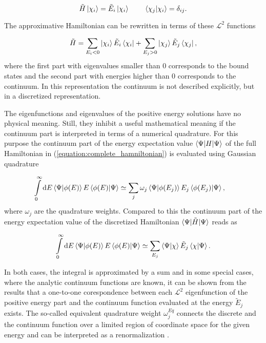 \begin{equation}
  \tilde{H} \ket{\chi_i} = \tilde{E}_i \ket{\chi_i} \quad\quad  \,
  \braket{\chi_j|\chi_i} = \delta_{ij} .
\end{equation}

The approximative Hamiltonian can be rewritten in terms of these $\mathcal{L}^2$
functions

\begin{equation} \label{equation:discrete_hamiltonian}
  \tilde{H} = \sum\limits_{E_i<0} \ket{\chi_i} \tilde{E}_i \bra{\chi_i}
            + \sum\limits_{E_j>0} \ket{\chi_j} \tilde{E}_j \bra{\chi_j}   ,
\end{equation}
where the first part with eigenvalues smaller than 0 corresponds to the
bound states and the second part with energies higher than 0 corresponds to
the continuum. In this representation the continuum is not described explicitly,
but in a discretized representation.

The eigenfunctions and eigenvalues of the positive energy solutions have no physical
meaning. Still, they inhibit a useful
mathematical meaning if the continuum part is interpreted in terms of
a numerical quadrature.
For this purpose the continuum part of the energy expectation value
$\braket{\Psi| H | \Psi}$ of the full Hamiltonian in
(\ref{equation:complete_hamniltonian}) is evaluated using Gaussian quadrature

\begin{align}
  \int\limits_0^\infty \mathrm{d}E \braket{\Psi|\phi(E)} E \braket{\phi(E)|\Psi}
  &\simeq \sum\limits_j \omega_j \braket{\Psi|\phi(E_j)} E_j \braket{\phi(E_j)|\Psi} ,
\end{align}
where  $\omega_j$ are the quadrature weights.
Compared to this the continuum part of the energy expectation
value of the discretized Hamiltonian $\braket{\Psi| \tilde{H} | \Psi}$ reads as

\begin{equation}
  \int\limits_0^\infty \mathrm{d}E \braket{\Psi|\phi(E)} E \braket{\phi(E)|\Psi}
  \simeq \sum\limits_{E_j}  \braket{\Psi|\chi} \tilde{E}_j \braket{\chi|\Psi}   .
\end{equation}

In both cases, the integral is approximated by a sum and in some special cases,
where the analytic continuum functions are known, it can be shown from the results
that a one-to-one corespondence between each $\mathcal{L}^2$
eigenfunction of the positive energy part and the continuum function evaluated
at the energy $\tilde{E}_j$ exists. The so-called equivalent quadrature
weight $\omega_j^{Eq}$ connects the discrete and
the continuum function over a limited region of coordinate space
for the given energy and can be interpreted
as a renormalization \cite{Reinhardt79}.

